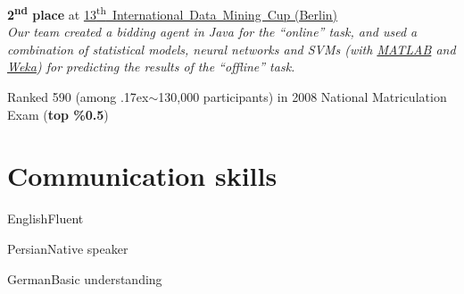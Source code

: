 \documentclass{tccv}
\renewcommand{\tilde}{\raise.17ex\hbox{$\scriptstyle\sim$}}
\begin{document}
\begin{list}{}{\leftmargin=1em}

\item
{\bf 2\textsuperscript{nd} place} at \href{http://www.data-mining-cup.de/en/review/dmc-2012/}{\mbox{13\textsuperscript{th} International Data Mining Cup} (Berlin)}
\\
{\it Our team created a bidding agent in Java for the \mbox{``online''} task, and used a combination of statistical models, \mbox{neural} networks and SVMs (with \href{http://www.mathworks.com/products/matlab/}{MATLAB} and \href{http://www.cs.waikato.ac.nz/ml/weka/}{Weka}) for predicting the results of the \mbox{``offline''} task.}



\item
Ranked 590 (among \tilde130,000 participants) in 2008 \mbox{National} Matriculation Exam ({\bf top \%0.5})


\end{list}







\vspace{4pt}



\section{Communication skills}


\begin{factlist}

\item{English}{Fluent}

\item{Persian}{Native speaker}

\item{German}{Basic understanding}

\end{factlist}



\sectionline

\vspace{-3pt}
\end{document}
